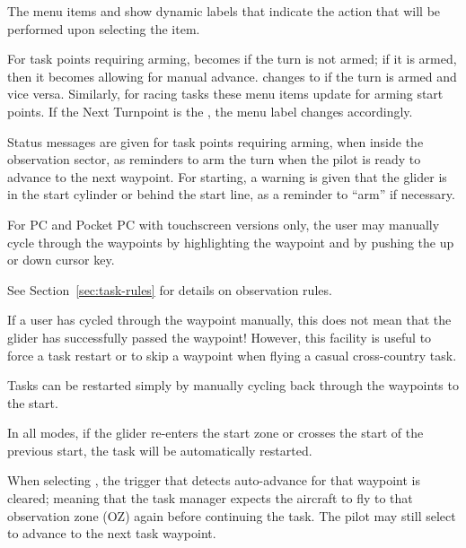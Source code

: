 The menu items  and
 show dynamic labels that
indicate the action that will be performed upon selecting the item.

For task points requiring arming,  becomes 
 if the turn is not armed; if it is armed, then it becomes 
 allowing for manual advance. 
 changes to  if the turn is armed 
and vice versa. Similarly, for racing tasks these menu items update for arming 
start points. If the Next Turnpoint is the , the menu 
label changes accordingly.

Status messages are given for task points requiring arming, when
inside the observation sector, as reminders to arm the turn when the
pilot is ready to advance to the next waypoint. For starting, a
warning is given that the glider is in the start cylinder or behind
the start line, as a reminder to ``arm'' if necessary.

For PC and Pocket PC with touchscreen versions only, the user may
manually cycle through the waypoints by highlighting the waypoint
{\InfoBox} and by pushing the up or down cursor key.

See Section~\ref{sec:task-rules} for details on observation rules.

If a user has cycled through the waypoint manually, this does not mean
that the glider has successfully passed the waypoint!  However, this
facility is useful to force a task restart or to skip a waypoint when
flying a casual cross-country task.

\tip Tasks can be restarted simply by manually cycling back through the
waypoints to the start.

In all modes, if the glider re-enters the start zone or crosses the
start of the previous start, the task will be automatically restarted. 

When selecting , the trigger that detects
auto-advance for that waypoint is cleared; meaning that the task
manager expects the aircraft to fly to that observation zone (OZ)
again before continuing the task. The pilot may still select  to advance to the next task waypoint.

